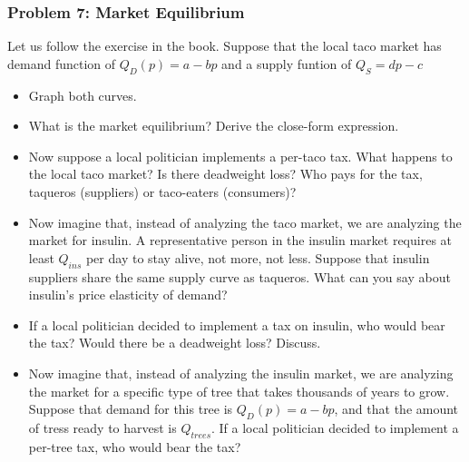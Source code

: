 \documentclass{article}
\begin{document}
\subsubsection*{Problem 7: Market Equilibrium}
Let us follow the exercise in the book. Suppose that the local taco market has
demand function of \(Q_D(p) = a-bp\) and a supply funtion of \(Q_S = dp - c\)
\begin{itemize}
  \item Graph both curves.
  \item What is the market equilibrium? Derive the close-form expression.
  \item Now suppose a local politician implements a per-taco tax. What happens
  to the local taco market? Is there deadweight loss? Who pays for the tax,
  taqueros (suppliers) or taco-eaters (consumers)?
  \item Now imagine that, instead of analyzing the taco market, we are analyzing
  the market for insulin. A representative person in the insulin market requires
  at least \(Q_{ins}\) per day to stay alive, not more, not less. Suppose that
  insulin suppliers share the same supply curve as taqueros. What can you say
  about insulin's price elasticity of demand?
  \item If a local politician decided to implement a tax on insulin, who would bear
  the tax? Would there be a deadweight loss? Discuss.
  \item Now imagine that, instead of analyzing the insulin market, we are analyzing
  the market for a specific type of tree that takes thousands of years to grow.
  Suppose that demand for this tree is \(Q_D(p) = a-bp\), and that the amount of
  tress ready to harvest is \(Q_{trees}\). If a local politician decided to implement
  a per-tree tax, who would bear the tax?
\end{itemize}
\newpage
\printbibliography
\end{document}
